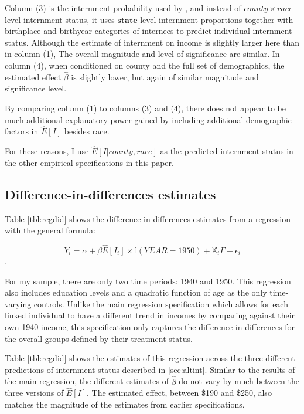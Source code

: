 Column (3) is the internment probability used by \cite{arellano-boverDisplacementDiversityMobility2022},
and instead of $county\times race$ level internment status,
it uses $\textbf{state}$-level internment proportions
together with birthplace and birthyear categories of internees
to predict individual internment status.
Although the estimate of internment on income is slightly larger here
than in column (1),
The overall magnitude and level of significance are similar.
In column (4), when conditioned on county and the full set of demographics,
the estimated effect $\hat{\beta}$  is slightly lower,
but again of similar magnitude and significance level.

By comparing column (1) to columns (3) and (4),
there does not appear to be much additional explanatory power gained 
by including additional demographic factors in $\hat{E}[I]$ besides race.

For these reasons, I use $\hat{E}[I|county, race]$
as the predicted internment status in the other empirical specifications
in this paper.


\subsection{Difference-in-differences estimates}

Table \ref{tbl:regdid} shows the difference-in-differences estimates
from a regression with the general formula:

\begin{equation}\label{eq:didreg}
  Y_i = \alpha + \beta \hat{E}[I_i]\times\mathbb{I}(YEAR=1950) 
        + \mathbb{X}_i \Gamma + \epsilon_i
\end{equation}.

For my sample, there are only two time periods: 1940 and 1950.
This regression also includes education levels and a quadratic function of age
as the only time-varying controls.
Unlike the main regression specification which allows for each linked individual
to have a different trend in incomes by comparing against their own 1940 income,
this specification only captures the difference-in-differences for the overall
groups defined by their treatment status.



Table \ref{tbl:regdid} shows the estimates of this regression across
the three different predictions of internment status described in \ref{sec:altint}.
Similar to the results of the main regression, the different estimates
of $\hat{\beta}$ do not vary by much between the three versions of $\hat{E}[I]$.
The estimated effect, between \$190 and \$250, also matches the
magnitude of the estimates from earlier specifications.


